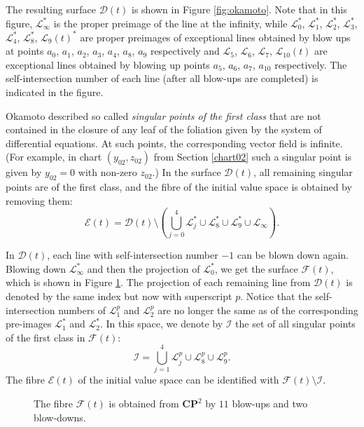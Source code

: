 The resulting surface $\mathcal{D}(t)$ is shown in Figure \ref{fig:okamoto}.
Note that in this figure, $\mathcal{L}_{\infty}^*$ is the proper preimage of the line at the infinity, while
$\mathcal{L}_{0}^*$, $\mathcal{L}_{1}^*$, $\mathcal{L}_{2}^*$, $\mathcal{L}_{3}^*$, $\mathcal{L}_{4}^*$, $\mathcal{L}_{8}^*$, $\mathcal{L}_{9}(t)^*$  are proper preimages of exceptional lines obtained by blow ups at points $a_0$, $a_1$, $a_2$, $a_3$, $a_4$, $a_8$, $a_9$ respectively
and $\mathcal{L}_{5}$, $\mathcal{L}_{6}$, $\mathcal{L}_{7}$, $\mathcal{L}_{10}(t)$ are exceptional lines obtained by blowing up points $a_5$, $a_6$, $a_7$, $a_{10}$ respectively. 
The self-intersection number of each line (after all blow-ups are completed) is indicated in the figure.

Okamoto described so called \emph{singular points of the first class} that are not contained in the closure of any leaf of the foliation given by the system of differential equations.
At such points, the corresponding vector field is infinite.
(For example, in chart $(y_{02},z_{02})$ from Section \ref{chart02} such a singular point is given by $y_{02}=0$ with non-zero $z_{02}$.)
In the surface $\mathcal{D}(t)$, all remaining singular points are of the first class, and the fibre of the initial value space is obtained by removing them:
$$
\mathcal{E}(t)=\mathcal{D}(t)\setminus\left(\bigcup_{j=0}^4\mathcal{L}_j^*\cup\mathcal{L}_8^*\cup\mathcal{L}_9^*\cup\mathcal{L}_{\infty}\right).
$$







In $\mathcal{D}(t)$, each line with self-intersection number $-1$ can be blown down again. 
Blowing down $\mathcal{L}_{\infty}^*$ and then the projection of $\mathcal{L}_{0}^*$, we get the surface $\mathcal{F}(t)$, which is shown in Figure \ref{fig:okamoto-blow-down}.
The projection of each remaining line from $\mathcal{D}(t)$ is denoted by the same index but now with superscript $p$.
Notice that the self-intersection numbers of $\mathcal{L}_{1}^p$ and $\mathcal{L}_{2}^p$ are no longer the same as of the corresponding pre-images $\mathcal{L}_{1}^*$ and $\mathcal{L}_{2}^*$.
In this space,  we denote by $\mathcal{I}$ the set of all singular points of the first class in $\mathcal{F}(t)$:
$$
\mathcal{I}=\bigcup_{j=1}^4\mathcal{L}_j^p\cup\mathcal{L}_8^p\cup\mathcal{L}_9^p.
$$
The fibre $\mathcal{E}(t)$ of the initial value space can be identified with $\mathcal{F}(t)\setminus\mathcal{I}$.

\begin{figure}[h]
\centering

\caption{The fibre $\mathcal{F}(t)$ is obtained from $\mathbf{CP}^2$ by $11$ blow-ups and two blow-downs.}\label{fig:okamoto-blow-down}
\end{figure}


